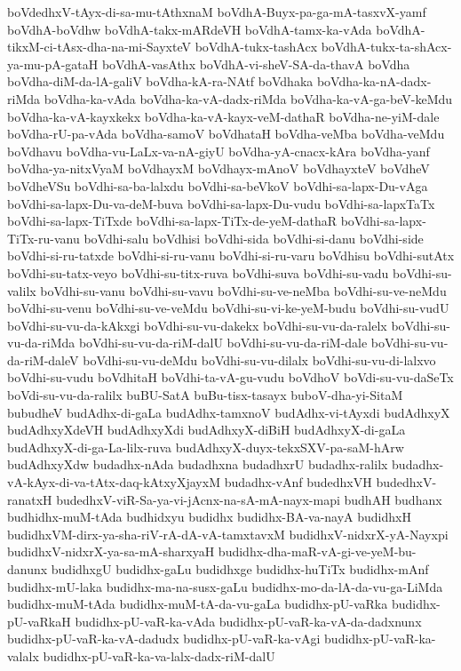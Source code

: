 {boVdedhxV-tAyx-di-sa-mu-tAthxnaM
boVdhA-Buyx-pa-ga-mA-tasxvX-yamf
boVdhA-boVdhw
boVdhA-takx-mARdeVH
boVdhA-tamx-ka-vAda
boVdhA-tikxM-ci-tAsx-dha-na-mi-SayxteV
boVdhA-tukx-tashAcx
boVdhA-tukx-ta-shAcx-ya-mu-pA-gataH
boVdhA-vasAthx
boVdhA-vi-sheV-SA-da-thavA
boVdha
boVdha-diM-da-lA-galiV
boVdha-kA-ra-NAtf
boVdhaka
boVdha-ka-nA-dadx-riMda
boVdha-ka-vAda
boVdha-ka-vA-dadx-riMda
boVdha-ka-vA-ga-beV-keMdu
boVdha-ka-vA-kayxkekx
boVdha-ka-vA-kayx-veM-dathaR
boVdha-ne-yiM-dale
boVdha-rU-pa-vAda
boVdha-samoV
boVdhataH
boVdha-veMba
boVdha-veMdu
boVdhavu
boVdha-vu-LaLx-va-nA-giyU
boVdha-yA-cnacx-kAra
boVdha-yanf
boVdha-ya-nitxVyaM
boVdhayxM
boVdhayx-mAnoV
boVdhayxteV
boVdheV
boVdheVSu
boVdhi-sa-ba-lalxdu
boVdhi-sa-beVkoV
boVdhi-sa-lapx-Du-vAga
boVdhi-sa-lapx-Du-va-deM-buva
boVdhi-sa-lapx-Du-vudu
boVdhi-sa-lapxTaTx
boVdhi-sa-lapx-TiTxde
boVdhi-sa-lapx-TiTx-de-yeM-dathaR
boVdhi-sa-lapx-TiTx-ru-vanu
boVdhi-salu
boVdhisi
boVdhi-sida
boVdhi-si-danu
boVdhi-side
boVdhi-si-ru-tatxde
boVdhi-si-ru-vanu
boVdhi-si-ru-varu
boVdhisu
boVdhi-sutAtx
boVdhi-su-tatx-veyo
boVdhi-su-titx-ruva
boVdhi-suva
boVdhi-su-vadu
boVdhi-su-valilx
boVdhi-su-vanu
boVdhi-su-vavu
boVdhi-su-ve-neMba
boVdhi-su-ve-neMdu
boVdhi-su-venu
boVdhi-su-ve-veMdu
boVdhi-su-vi-ke-yeM-budu
boVdhi-su-vudU
boVdhi-su-vu-da-kAkxgi
boVdhi-su-vu-dakekx
boVdhi-su-vu-da-ralelx
boVdhi-su-vu-da-riMda
boVdhi-su-vu-da-riM-dalU
boVdhi-su-vu-da-riM-dale
boVdhi-su-vu-da-riM-daleV
boVdhi-su-vu-deMdu
boVdhi-su-vu-dilalx
boVdhi-su-vu-di-lalxvo
boVdhi-su-vudu
boVdhitaH
boVdhi-ta-vA-gu-vudu
boVdhoV
boVdi-su-vu-daSeTx
boVdi-su-vu-da-ralilx
buBU-SatA
buBu-tisx-tasayx
buboV-dha-yi-SitaM
bubudheV
budAdhx-di-gaLa
budAdhx-tamxnoV
budAdhx-vi-tAyxdi
budAdhxyX
budAdhxyXdeVH
budAdhxyXdi
budAdhxyX-diBiH
budAdhxyX-di-gaLa
budAdhxyX-di-ga-La-lilx-ruva
budAdhxyX-duyx-tekxSXV-pa-saM-hArw
budAdhxyXdw
budadhx-nAda
budadhxna
budadhxrU
budadhx-ralilx
budadhx-vA-kAyx-di-va-tAtx-daq-kAtxyXjayxM
budadhx-vAnf
budedhxVH
budedhxV-ranatxH
budedhxV-viR-Sa-ya-vi-jAcnx-na-sA-mA-nayx-mapi
budhAH
budhanx
budhidhx-muM-tAda
budhidxyu
budidhx
budidhx-BA-va-nayA
budidhxH
budidhxVM-dirx-ya-sha-riV-rA-dA-vA-tamxtavxM
budidhxV-nidxrX-yA-Nayxpi
budidhxV-nidxrX-ya-sa-mA-sharxyaH
budidhx-dha-maR-vA-gi-ve-yeM-bu-danunx
budidhxgU
budidhx-gaLu
budidhxge
budidhx-huTiTx
budidhx-mAnf
budidhx-mU-laka
budidhx-ma-na-susx-gaLu
budidhx-mo-da-lA-da-vu-ga-LiMda
budidhx-muM-tAda
budidhx-muM-tA-da-vu-gaLa
budidhx-pU-vaRka
budidhx-pU-vaRkaH
budidhx-pU-vaR-ka-vAda
budidhx-pU-vaR-ka-vA-da-dadxnunx
budidhx-pU-vaR-ka-vA-dadudx
budidhx-pU-vaR-ka-vAgi
budidhx-pU-vaR-ka-valalx
budidhx-pU-vaR-ka-va-lalx-dadx-riM-dalU
}
